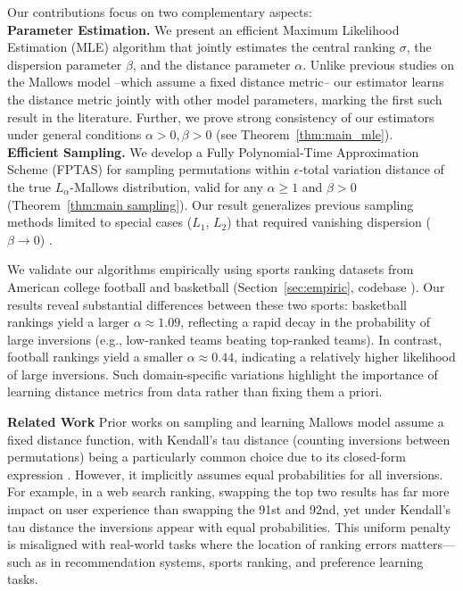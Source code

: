 \documentclass{article}
\begin{document}
Our contributions focus on two complementary aspects:\\
       \textbf{Parameter Estimation.}  We present an efficient Maximum Likelihood Estimation (MLE) algorithm that jointly estimates the central ranking \(\sigma\), the dispersion parameter \(\beta\), and the distance parameter \(\alpha\).  Unlike previous studies on the Mallows model --which assume a fixed distance metric-- our estimator learns the distance metric jointly with other model parameters, marking the first such result in the literature.  Further, we prove strong consistency of our estimators under general conditions  $\alpha > 0, \beta > 0$  (see Theorem~\ref{thm:main_mle}).        
       \\
       \textbf{Efficient Sampling.} We develop a Fully Polynomial-Time Approximation Scheme (FPTAS) for sampling permutations within \(\epsilon\)-total variation distance of the true \(L_\alpha\)-Mallows distribution, valid for any \(\alpha \geq 1\) and \(\beta > 0\) (Theorem~\ref{thm:main sampling}).
       Our result generalizes previous sampling methods limited to special cases ($L_1$, $L_2$) that required vanishing dispersion (\(\beta \to 0\)) \cite{zhong2021mallows,mukherjee2016estimation}.

We validate our algorithms empirically using sports ranking datasets from American college football and basketball (Section~\ref{sec:empiric}, codebase \cite{asgari2025code}). Our results reveal substantial differences between these two sports: basketball rankings yield a larger $\alpha \approx 1.09$,  reflecting a rapid decay in the probability of large inversions (e.g., low-ranked teams beating top-ranked teams). In contrast, football rankings yield a smaller $\alpha \approx 0.44$, indicating a relatively higher likelihood of large inversions. Such domain-specific variations highlight the importance of learning distance metrics from data rather than fixing them a priori.

\textbf{Related Work}
Prior works on sampling and learning Mallows model assume a fixed distance function, with Kendall's tau distance (counting inversions between permutations) \cite{kendall1938new} being a particularly common choice due to its closed-form expression \cite{doignon2004repeated,fligner1986distance, irurozki2014sampling, lu2014effective,rubinstein2017sorting}. However, it implicitly assumes equal probabilities for all inversions.
For example,  in a web search ranking, swapping the top two results has far more impact on user experience than swapping the 91st and 92nd, yet under Kendall’s tau distance the inversions appear with equal probabilities.
This uniform penalty is misaligned with real-world tasks where the location of ranking errors matters—such as in recommendation systems, sports ranking, and preference learning tasks.
\end{document}
